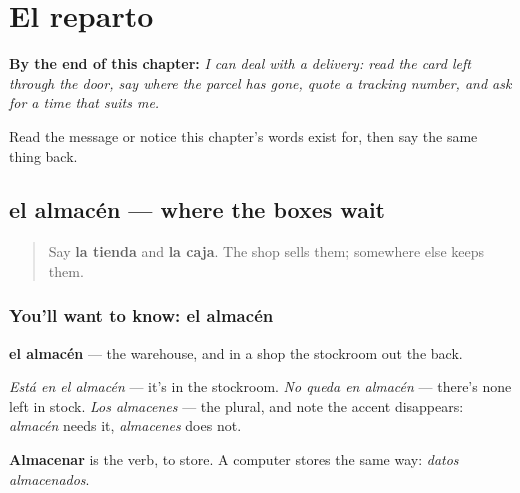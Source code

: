 
\chapter{El reparto}
\label{ch:es-reparto}

\begin{chapteropening}
\textbf{By the end of this chapter:} \emph{I can deal with a delivery: read the card left through the door, say where the parcel has gone, quote a tracking number, and ask for a time that suits me.}

Read the message or notice this chapter's words exist for, then say the same thing back.
\end{chapteropening}

\section[el almacén]{el almacén — where the boxes wait}

\label{lesson:ES-C452-almacen}



\begin{quote}
Say \textbf{la tienda} and \textbf{la caja}. The shop sells them; somewhere else keeps them.
\end{quote}

\subsection*{You'll want to know: el almacén}
\textbf{el almacén} — the warehouse, and in a shop the stockroom out the back.

\emph{Está en el almacén} — it's in the stockroom. \emph{No queda en almacén} — there's none left in stock. \emph{Los almacenes} — the plural, and note the accent disappears: \emph{almacén} needs it, \emph{almacenes} does not.

\textbf{Almacenar} is the verb, to store. A computer stores the same way: \emph{datos almacenados}.

